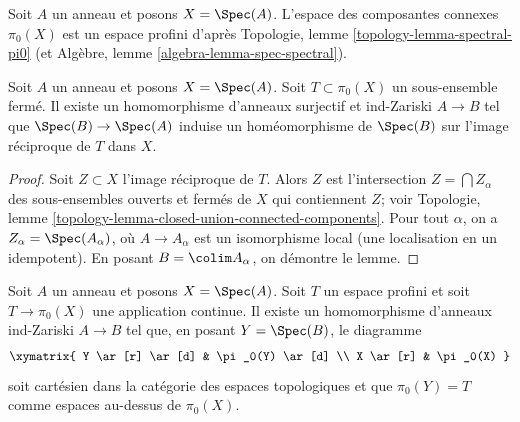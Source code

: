 \medskip\noindent
Soit $A$ un anneau et posons $X = \Spec(A)$. L'espace des composantes
connexes $\pi_0(X)$ est un espace profini d'apr\`es
Topologie, lemme \ref{topology-lemma-spectral-pi0}
(et Alg\`ebre, lemme \ref{algebra-lemma-spec-spectral}).

\begin{lemma}
\label{lemma-construct}
Soit $A$ un anneau et posons $X = \Spec(A)$. Soit $T \subset \pi_0(X)$ un
sous-ensemble ferm\'e. Il existe un homomorphisme d'anneaux surjectif et ind-Zariski $A \to B$
tel que $\Spec(B) \to \Spec(A)$ induise un hom\'eomorphisme de $\Spec(B)$
sur l'image r\'eciproque de $T$ dans $X$.
\end{lemma}

\begin{proof}
Soit $Z \subset X$ l'image r\'eciproque de $T$. Alors $Z$ est l'intersection
$Z = \bigcap Z_\alpha$ des sous-ensembles ouverts et ferm\'es de $X$ qui contiennent $Z$;
voir Topologie, lemme \ref{topology-lemma-closed-union-connected-components}.
Pour tout $\alpha$, on a $Z_\alpha = \Spec(A_\alpha)$, o\`u
$A \to A_\alpha$ est un isomorphisme local (une localisation en un idempotent).
En posant $B = \colim A_\alpha$, on d\'emontre le lemme.
\end{proof}

\begin{lemma}
\label{lemma-construct-profinite}
Soit $A$ un anneau et posons $X = \Spec(A)$. Soit $T$ un espace profini et
soit $T \to \pi_0(X)$ une application continue. Il existe un
homomorphisme d'anneaux ind-Zariski $A \to B$ tel que, en posant $Y = \Spec(B)$, le diagramme
$$
\xymatrix{
Y \ar[r] \ar[d] & \pi_0(Y) \ar[d] \\
X \ar[r] & \pi_0(X)
}
$$
soit cart\'esien dans la cat\'egorie des espaces topologiques et que
$\pi_0(Y) = T$ comme espaces au-dessus de $\pi_0(X)$.
\end{lemma}

